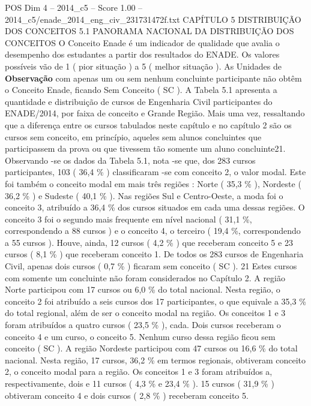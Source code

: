 \begin{textsample}{POS Dim 4 – 2014\_c5 – Score 1.00 – 2014\_c5/enade\_2014\_eng\_civ\_231731472f.txt}  \label{ex:f4_pos_159}
CAPÍTULO 5 DISTRIBUIÇÃO DOS CONCEITOS 5.1 PANORAMA NACIONAL DA DISTRIBUIÇÃO DOS CONCEITOS O Conceito Enade é um indicador de qualidade que avalia o desempenho dos estudantes a partir dos resultados do ENADE.
Os valores possíveis vão de 1 ( pior situação ) a 5 ( melhor situação ).
As Unidades de \textbf{Observação} com apenas um ou sem nenhum concluinte participante não obtêm o Conceito Enade, ficando Sem Conceito ( SC ).
A Tabela 5.1 apresenta a quantidade e distribuição de cursos de Engenharia Civil participantes do ENADE/2014, por faixa de conceito e Grande Região.
Mais uma vez, ressaltando que a diferença entre os cursos tabulados neste capítulo e no capítulo 2 são os cursos sem conceito, em princípio, aqueles sem alunos concluintes que participassem da prova ou que tivessem tão somente um aluno concluinte21.
Observando -se os dados da Tabela 5.1, nota -se que, dos 283 cursos participantes, 103 ( 36,4 \% ) classificaram -se com conceito 2, o valor modal.
Este foi também o conceito modal em mais três regiões : Norte ( 35,3 \% ), Nordeste ( 36,2 \% ) e Sudeste ( 40,1 \% ).
Nas regiões Sul e Centro-Oeste, a moda foi o conceito 3, atribuído a 36,4 \% dos cursos situados em cada uma dessas regiões.
O conceito 3 foi o segundo mais frequente em nível nacional ( 31,1 \%, correspondendo a 88 cursos ) e o conceito 4, o terceiro ( 19,4 \%, correspondendo a 55 cursos ).
Houve, ainda, 12 cursos ( 4,2 \% ) que receberam conceito 5 e 23 cursos ( 8,1 \% ) que receberam conceito 1.
De todos os 283 cursos de Engenharia Civil, apenas dois cursos ( 0,7 \% ) ficaram sem conceito ( SC ). 21 Estes cursos com somente um concluinte não foram considerados no Capítulo 2.
A região Norte participou com 17 cursos ou 6,0 \% do total nacional.
Nesta região, o conceito 2 foi atribuído a seis cursos dos 17 participantes, o que equivale a 35,3 \% do total regional, além de ser o conceito modal na região.
Os conceitos 1 e 3 foram atribuídos a quatro cursos ( 23,5 \% ), cada.
Dois cursos receberam o conceito 4 e um curso, o conceito 5.
Nenhum curso dessa região ficou sem conceito ( SC ).
A região Nordeste participou com 47 cursos ou 16,6 \% do total nacional.
Nesta região, 17 cursos, 36,2 \% em termos regionais, obtiveram conceito 2, o conceito modal para a região.
Os conceitos 1 e 3 foram atribuídos a, respectivamente, dois e 11 cursos ( 4,3 \% e 23,4 \% ). 15 cursos ( 31,9 \% ) obtiveram conceito 4 e dois cursos ( 2,8 \% ) receberam conceito 5.

\end{textsample}
